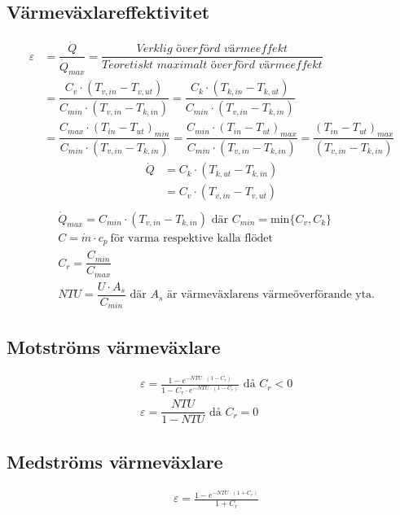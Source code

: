 	\subsection*{Värmeväxlareffektivitet}
	\begin{align*}
		\varepsilon & = \dfrac{\dot{Q}}{\dot{Q}_{max}}=
		\dfrac{\textit{Verklig överförd värmeeffekt}}{\textit{Teoretiskt maximalt överförd värmeeffekt}} \\
		& = \dfrac{C_v \cdot (T_{v,in} - T_{v,ut})}{C_{min} \cdot (T_{v,in} - T_{k,in})}
		 = \dfrac{C_k \cdot (T_{k,in} - T_{k,ut})}{C_{min} \cdot (T_{v,in} - T_{k,in})} \\
		& = \dfrac{C_{max} \cdot (T_{in} - T_{ut})_{min}}{C_{min} \cdot (T_{v,in} - T_{k,in})}
		= \dfrac{C_{min} \cdot (T_{in} - T_{ut})_{max}}{C_{min} \cdot (T_{v,in} - T_{k,in})} 
		= \dfrac{(T_{in} - T_{ut})_{max}}{(T_{v,in} - T_{k,in})}
	\end{align*}
	\begin{align*}
		\dot{Q}&=C_k \cdot (T_{k,ut} - T_{k,in}) \\
		 &=C_v \cdot (T_{v,in} - T_{v,ut}) \\
	\end{align*}
	\vspace{-4em} %
	\begin{align*}
	&\dot{Q}_{max}=C_{min} \cdot (T_{v,in} - T_{k,in}) \text{ där } C_{min} = \text{min} \{C_v, C_k\} \\
	& C = \dot{m} \cdot c_p \ \text{för varma respektive kalla flödet} \\
	& C_r = \dfrac{C_{min}}{C_{max}} \\
	&\textit{NTU}=\dfrac{U \cdot A_s}{C_{min}} \text{ där } A_s \text{ är värmeväxlarens värmeöverförande yta.}
	\end{align*}
	\subsection*{Motströms värmeväxlare}
	\begin{align*}
		& \varepsilon = \frac{1 - e^{-NTU \cdot (1 - C_r)}}{1 - C_r \cdot e^{-NTU \cdot (1 - C_r)}} \text{ då } C_r<0\\
		& \varepsilon = \dfrac{NTU}{1-NTU} \text{ då } C_r=0
	\end{align*}
	\subsection*{Medströms värmeväxlare}
	\begin{align*}
		& \varepsilon = \frac{1 - e^{-NTU \cdot (1 + C_r)}}{1 + C_r} 
	\end{align*}
